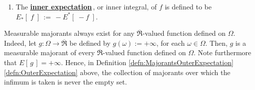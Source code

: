 \begin{definition}
\begin{enumerate}
\begin{equation*}
\begin{array}{c}
				\\
				\textnormal{$E\!\left[\,g\,\right] \in \overline{\Re}$ is defined ($g$ need not be $\mu$-integrable)}
			\end{array}
			\right.
			\right\}
	\end{equation*}
\item
	The \underline{\textbf{inner expectation}}\,, or inner integral,
	of $f$ is defined to be
	$E_{*}\!\left[\;f\;\right] \, := \, - E^{*}\!\left[\;- f\;\right]$.
\end{enumerate}
\end{definition}

\begin{remark}
\mbox{}\vskip 0.1cm
\noindent
Measurable majorants always exist for any $\overline{\Re}$-valued function defined on $\Omega$.
Indeed, let $g : \Omega \longrightarrow \overline{\Re}$ be defined by $g(\omega) := +\infty$, for each $\omega \in \Omega$.
Then, $g$ is a measurable majorant of every $\overline{\Re}$-valued function defined on $\Omega$.
Note furthermore that $E\!\left[\,g\,\right] = +\infty$.
Hence, in Definition \ref{defn:MajorantsOuterExpectation} \eqref{defn:OuterExpectation} above,
the collection of majorants over which the infimum is taken is never the empty set.
\end{remark}

